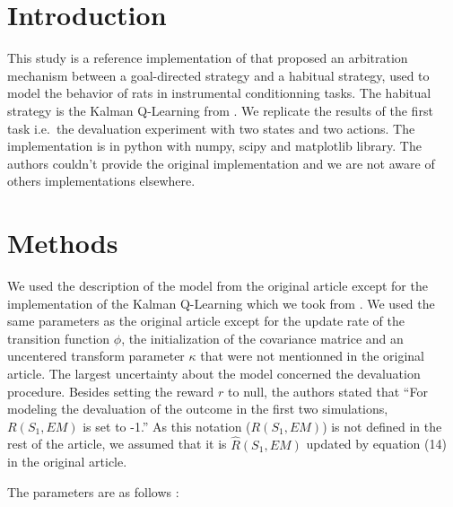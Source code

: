 \documentclass[10pt,a4paper,onecolumn]{article}
\begin{document}
\section{Introduction}\label{introduction}

This study is a reference implementation of \textcite{keramati} that
proposed an arbitration mechanism between a goal-directed strategy and a
habitual strategy, used to model the behavior of rats in instrumental
conditionning tasks. The habitual strategy is the Kalman Q-Learning from
\textcite{geist}. We replicate the results of the first task i.e.~the
devaluation experiment with two states and two actions. The
implementation is in python with numpy, scipy and matplotlib library.
The authors couldn't provide the original implementation and we are not
aware of others implementations elsewhere.

\section{Methods}\label{methods}

We used the description of the model from the original article except
for the implementation of the Kalman Q-Learning which we took from
\textcite{geist}. We used the same parameters as the original article
except for the update rate of the transition function \(\phi\), the
initialization of the covariance matrice and an uncentered transform
parameter \(\kappa\) that were not mentionned in the original article.
The largest uncertainty about the model concerned the devaluation
procedure. Besides setting the reward \(r\) to null, the authors stated
that ``For modeling the devaluation of the outcome in the first two
simulations, \(R(S_1, EM)\) is set to -1.'' As this notation
(\(R(S_1, EM)\)) is not defined in the rest of the article, we assumed
that it is \(\hat{R}(S_1, EM)\) updated by equation (14) in the original
article.

The parameters are as follows :
\end{document}
